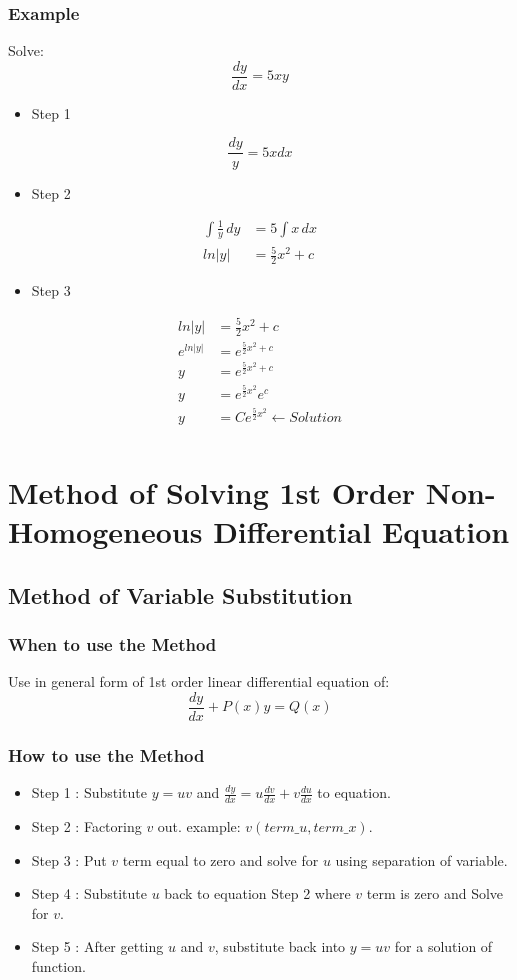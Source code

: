 \documentclass[12pt,a4paper]{article}
\begin{document}
	\subsubsection{Example}
	Solve:
	\[
	\frac{dy}{dx} = 5xy
	\]
	\begin{itemize}
		\item Step 1
	\end{itemize}
	\[
	\frac{dy}{y} = 5xdx
	\]
	\begin{itemize}
		\item Step 2
	\end{itemize}
	\[
	\begin{split}
		\int \frac{1}{y} \,dy &= 5 \int x \,dx \\
		ln|y| &= \frac{5}{2} x^2 + c
	\end{split}
	\]
	\begin{itemize}
		\item Step 3
	\end{itemize}
	\[
	\begin{split}
		ln|y| &= \frac{5}{2} x^2 + c \\
		e^{ln|y|} &= e^{\frac{5}{2} x^2 + c}\\
		y &= e^{\frac{5}{2} x^2 + c}\\
		y &= e^{\frac{5}{2} x^2}e^{c}\\
		y &= Ce^{\frac{5}{2} x^2} \leftarrow Solution\\ 
	\end{split}
	\]
	
	
	\section{Method of Solving 1st Order Non-Homogeneous Differential Equation}
	\subsection{Method of Variable Substitution}
	\subsubsection{When to use the Method}
	Use in general form of 1st order linear differential equation of:
	\[
	\frac{dy}{dx} + P(x)y = Q(x)
	\]
	\subsubsection{How to use the Method}
	\begin{itemize}
		\item Step 1 : Substitute $ y = uv $ and $ \frac{dy}{dx} = u\frac{dv}{dx} + v \frac{du}{dx}$ to equation.
		\item Step 2 : Factoring $ v $ out. example: $ v(term\_u, term\_x) $.
		\item Step 3 : Put $ v $ term equal to zero and solve for $ u $ using separation of variable.
		\item Step 4 : Substitute $ u $ back to equation Step 2 where $ v $ term is zero and Solve for $ v $.
		\item Step 5 : After getting $ u $ and $v$, substitute back into $ y = uv $ for a solution of function.
	\end{itemize}
\end{document}
